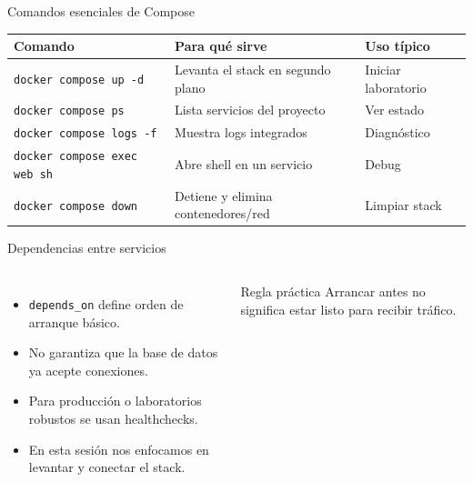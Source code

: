 \documentclass[aspectratio=169]{beamer}
\begin{document}
\begin{frame}[fragile]{Comandos esenciales de Compose}
  \scriptsize
  \begin{tabular}{p{} p{} p{}}
    \toprule
    Comando & Para qué sirve & Uso típico \\
    \midrule
    \texttt{docker compose up -d} & Levanta el stack en segundo plano & Iniciar laboratorio \\
    \texttt{docker compose ps} & Lista servicios del proyecto & Ver estado \\
    \texttt{docker compose logs -f} & Muestra logs integrados & Diagnóstico \\
    \texttt{docker compose exec web sh} & Abre shell en un servicio & Debug \\
    \texttt{docker compose down} & Detiene y elimina contenedores/red & Limpiar stack \\
    \bottomrule
  \end{tabular}
\end{frame}

\begin{frame}{Dependencias entre servicios}
  \begin{columns}[c]
    \small
    \begin{itemize}
      \item \texttt{depends\_on} define orden de arranque básico.
      \item No garantiza que la base de datos ya acepte conexiones.
      \item Para producción o laboratorios robustos se usan healthchecks.
      \item En esta sesión nos enfocamos en levantar y conectar el stack.
    \end{itemize}
    \begin{alertblock}{Regla práctica}
      Arrancar antes no significa estar listo para recibir tráfico.
    \end{alertblock}
    \centering
  \end{columns}
\end{frame}
\end{document}
